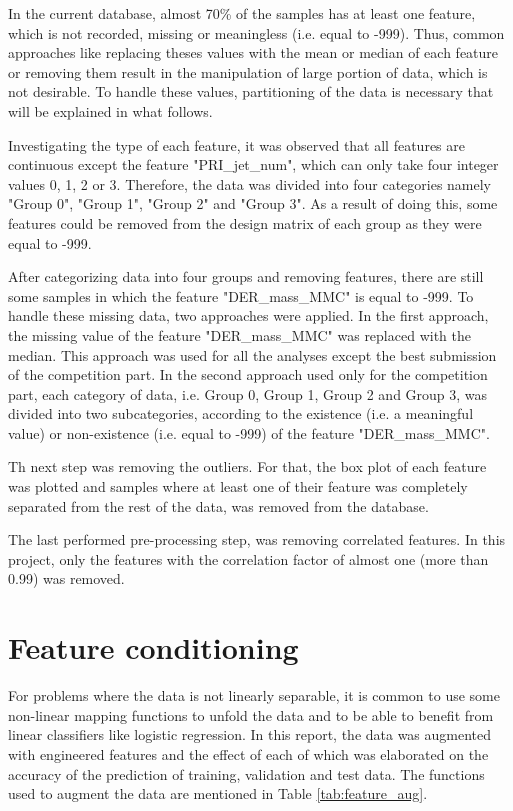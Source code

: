 \documentclass[10pt,conference,compsocconf]{IEEEtran}
\begin{document}
In the current database, almost 70\% of the samples has at least one feature, which is not recorded, missing or meaningless (i.e. equal to -999). Thus, common approaches like replacing theses values with the mean or median of each feature or removing them result in the manipulation of large portion of data, which is not desirable. To handle these values, partitioning of the data is necessary that will be explained in what follows. 

Investigating the type of each feature, it was observed that all features are continuous except the feature "PRI\_jet\_num", which can only take four integer values 0, 1, 2  or 3. Therefore, the data was divided into four categories namely "Group 0", "Group 1", "Group 2" and "Group 3". As a result of doing this, some features could be removed from the design matrix of each group as they were equal to -999.

After categorizing data into four groups and removing features, there are still some samples in which the feature "DER\_mass\_MMC" is equal to -999. To handle these missing data, two approaches were applied. In the first approach, the missing value of the feature  "DER\_mass\_MMC" was replaced with the median. This approach was used for all the analyses except the best submission of the competition part. In the second approach used only for the competition part, each category of data, i.e. Group 0, Group 1, Group 2 and Group 3, was divided into two subcategories, according to the existence (i.e. a meaningful value) or non-existence (i.e. equal to -999) of the feature "DER\_mass\_MMC".

Th next step was removing the outliers. For that, the box plot of each feature was plotted and samples where at least one of their feature was completely separated from the rest of the data, was removed from the database. 

The last performed pre-processing step, was removing correlated features. In this project, only the features with the correlation factor of almost one (more than 0.99) was removed. 

\section{Feature conditioning}
\label{sec:feature conditioning}
For problems where the data is not linearly separable, it is common to use some non-linear mapping functions to unfold the data and to be able to benefit from linear classifiers like logistic regression.
In this report, the data was augmented with engineered features and the effect of each of which was elaborated on the accuracy of the prediction of training, validation and test data. The functions used to augment the data are mentioned in Table \ref{tab:feature_aug}.
\end{document}

